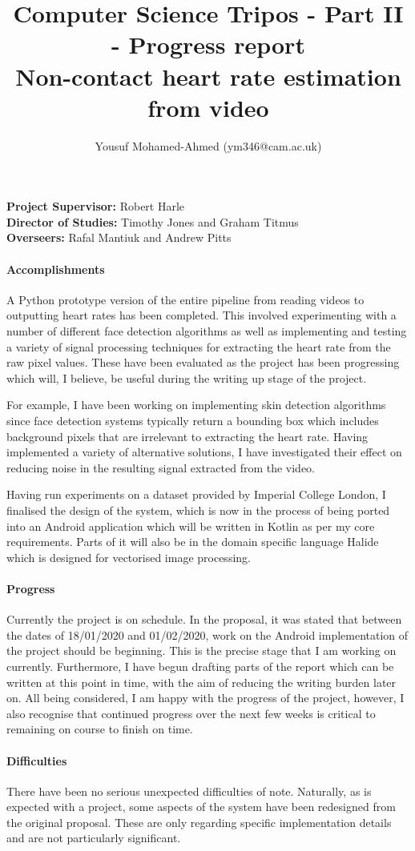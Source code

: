 \documentclass{article}
\title{Computer Science Tripos - Part II - Progress report\\
\textbf{Non-contact heart rate estimation from video}}
\author{Yousuf Mohamed-Ahmed \vspace{3ex} (ym346@cam.ac.uk)}
\begin{document}
\date{\vspace{-5ex}}
\maketitle
 \noindent
\textbf{Project Supervisor:} Robert Harle \\
\textbf{Director of Studies:} Timothy Jones and Graham Titmus \\
\textbf{Overseers:} Rafal Mantiuk and Andrew Pitts 

\paragraph{Accomplishments}
A Python prototype version of the entire pipeline from reading videos to outputting heart rates has been completed.
This involved experimenting with a number of different face detection algorithms as well as implementing and testing a variety of 
signal processing techniques for extracting the heart rate from the raw pixel values. These have been evaluated as the project has been progressing which will, I believe, be useful during the writing up stage of the project. 

For example, I have been working on implementing skin detection algorithms since face detection systems typically return a bounding box which includes background pixels that are irrelevant to extracting the heart rate. Having implemented a variety of alternative solutions, I have investigated their effect on reducing noise in the resulting signal extracted from the video.

Having run experiments on a dataset provided by Imperial College London, I finalised the design of the system, which is now in the process of being ported into an Android application which will be written in Kotlin as per my core requirements. Parts of it will also be in the domain specific language Halide which is designed for vectorised image processing. 


\paragraph{Progress}
Currently the project is on schedule. In the proposal, it was stated that between the dates of 18/01/2020 and 01/02/2020, work on the Android implementation of the project should be beginning. This is the precise stage that I am working on currently. Furthermore, I have begun drafting parts of the report which can be written at this point in time, with the aim of reducing the writing burden later on. All being considered, I am happy with the progress of the project, however, I also recognise that continued progress over the next few weeks is critical to remaining on course to finish on time.

\paragraph{Difficulties}
There have been no serious unexpected difficulties of note. Naturally, as is expected with a project, some aspects of the system have been redesigned from the original proposal. These are only regarding specific implementation details and are not particularly significant.
\end{document}
